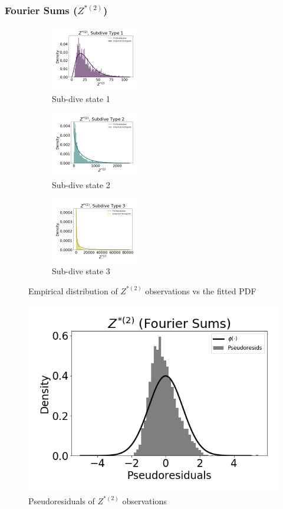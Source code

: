 \documentclass[12pt]{TD-CJS}
\begin{document}
\subsubsection{Fourier Sums ($Z^{*(2)}$)}

\begin{figure}[ht]
	\centering
	\begin{subfigure}[t]{0.3\textwidth}
        \centering
        \includegraphics[width=1.5in]{../Plots/empirical_hist_ahat_0.png}
        \caption{Sub-dive state 1}
    \end{subfigure}
    \begin{subfigure}[t]{0.3\textwidth}
        \centering
        \includegraphics[width=1.5in]{../Plots/empirical_hist_ahat_1.png}
        \caption{Sub-dive state 2}
    \end{subfigure}
    \begin{subfigure}[t]{0.3\textwidth}
        \centering
        \includegraphics[width=1.5in]{../Plots/empirical_hist_ahat_2.png}
        \caption{Sub-dive state 3}
    \end{subfigure}
    \caption{Empirical distribution of $Z^{*(2)}$ observations vs the fitted PDF}
\end{figure}

\begin{figure}
    \centering
    \includegraphics[width=5in]{../Plots/psedoresids_ahat.png}
    \caption{Pseudoresiduals of $Z^{*(2)}$ observations}
\end{figure}

\fi
\end{document}
